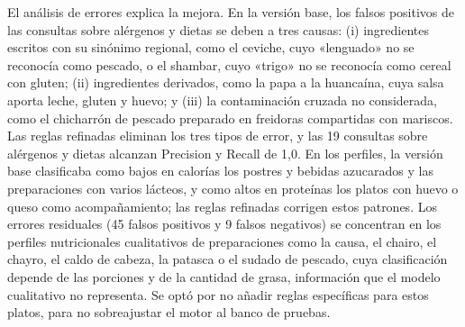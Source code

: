\documentclass[conference]{IEEEtran}
\begin{document}
El análisis de errores explica la mejora. En la versión base, los falsos positivos de las consultas sobre alérgenos y dietas se deben a tres causas: (i) ingredientes escritos con su sinónimo regional, como el ceviche, cuyo «lenguado» no se reconocía como pescado, o el shambar, cuyo «trigo» no se reconocía como cereal con gluten; (ii) ingredientes derivados, como la papa a la huancaína, cuya salsa aporta leche, gluten y huevo; y (iii) la contaminación cruzada no considerada, como el chicharrón de pescado preparado en freidoras compartidas con mariscos. Las reglas refinadas eliminan los tres tipos de error, y las 19 consultas sobre alérgenos y dietas alcanzan Precision y Recall de 1,0. En los perfiles, la versión base clasificaba como bajos en calorías los postres y bebidas azucarados y las preparaciones con varios lácteos, y como altos en proteínas los platos con huevo o queso como acompañamiento; las reglas refinadas corrigen estos patrones. Los errores residuales (45 falsos positivos y 9 falsos negativos) se concentran en los perfiles nutricionales cualitativos de preparaciones como la causa, el chairo, el chayro, el caldo de cabeza, la patasca o el sudado de pescado, cuya clasificación depende de las porciones y de la cantidad de grasa, información que el modelo cualitativo no representa. Se optó por no añadir reglas específicas para estos platos, para no sobreajustar el motor al banco de pruebas.
\end{document}
